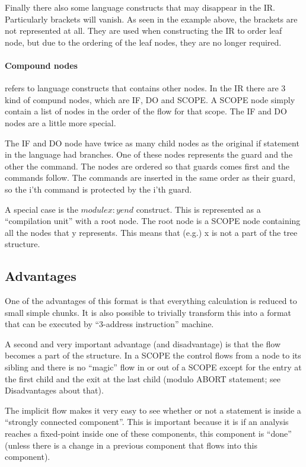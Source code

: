 Finally there also some language constructs that may disappear in the IR. Particularly
brackets will vanish. As seen in the example above, the brackets are not represented at
all. They are used when constructing the IR to order leaf node, but due to the ordering
of the leaf nodes, they are no longer required.

\paragraph*{Compound nodes}
refers to language constructs that contains other nodes. In the IR there are 3 kind of
compund nodes, which are IF, DO and SCOPE. A SCOPE node simply contain a list of nodes
in the order of the flow for that scope. The IF and DO nodes are a little more special.

  The IF and DO node have twice as many child nodes as the original if statement in the
language had branches. One of these nodes represents the guard and the other the command.
The nodes are ordered so that guards comes first and the commands follow. The commands
are inserted in the same order as their guard, so the i'th command is protected by the
i'th guard.

\docpar
A special case is the $module x : y end$ construct. This is represented as a ``compilation
unit'' with a root node. The root node is a SCOPE node containing all the nodes that y
represents. This means that (e.g.) x is not a part of the tree structure.

\subsection{Advantages}
One of the advantages of this format is that everything calculation is reduced to
small simple chunks. It is also possible to trivially transform this into a format
that can be executed by ``3-address instruction'' machine.

\docpar
A second and very important advantage (and disadvantage) is that the flow becomes
a part of the structure. In a SCOPE the control flows from a node to its sibling
and there is no ``magic'' flow in or out of a SCOPE except for the entry at the
first child and the exit at the last child (modulo ABORT statement; see
Disadvantages about that).

  The implicit flow makes it very easy to see whether or not a statement is inside a
``strongly connected component''. This is important because it is if an analysis reaches
a fixed-point inside one of these components, this component is ``done'' (unless there is
a change in a previous component that flows into this component).


